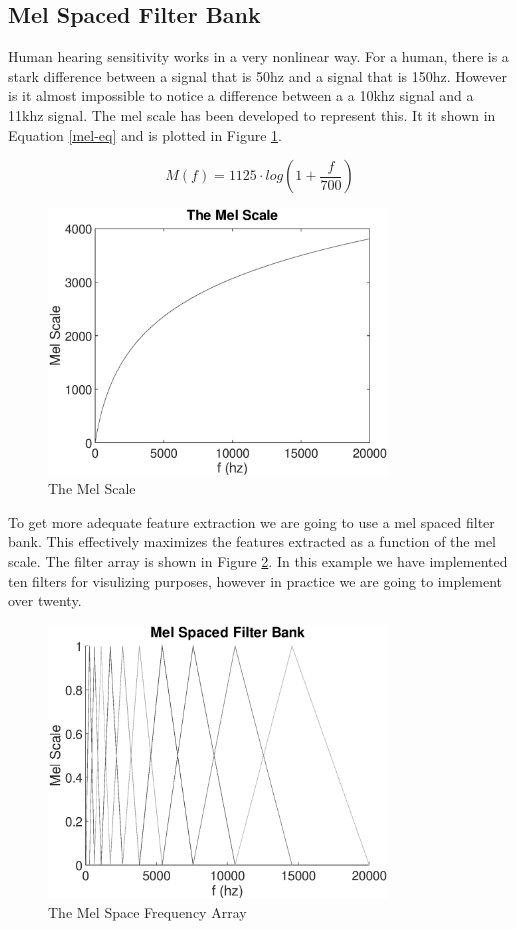 \documentclass{article}
\begin{document}
\subsection{Mel Spaced Filter Bank}
Human hearing sensitivity works in a very nonlinear way. For a human, there is a stark difference between a signal that is 50hz and a signal that is 150hz. However is it almost impossible to notice a difference between a a 10khz signal and a 11khz signal. The mel scale has been developed to represent this. It it shown in Equation \ref{mel-eq} and is plotted in Figure \ref{mel}. 

\begin{equation}
M(f) = 1125 \cdot log(1+\frac{f}{700})
\label{mel-eq}
\end{equation}

\begin{figure}[h]
\centering
\includegraphics[width=9cm]{mel.eps}
\caption{The Mel Scale}
\label{mel}
\end{figure}

To get more adequate feature extraction we are going to use a mel spaced filter bank. This effectively maximizes the features extracted as a function of the mel scale. The filter array is shown in Figure \ref{FA}. In this example we have implemented ten filters for visulizing purposes, however in practice we are going to implement over twenty.

\begin{figure}[H]
\centering
\includegraphics[width=9cm]{FA.eps}
\caption{The Mel Space Frequency Array}
\label{FA}
\end{figure}
\end{document}
